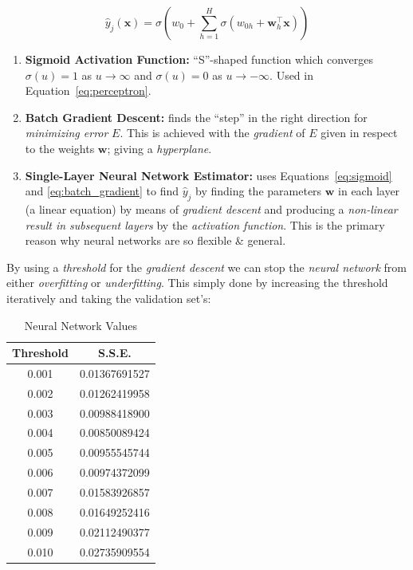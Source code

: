\documentclass[a4paper, twocolumn]{article}
\begin{document}
    \begin{equation} \label{eq:perceptron}
        \hat{y}_j(\bm{x}) = \sigma(w_0 + \sum_{h=1}^{H} \sigma(w_{0h} + \bm{w}_h^\intercal\bm{x}))
    \end{equation}

    \newpage
    \begin{enumerate}
        \item{\textbf{Sigmoid Activation Function:} ``S''-shaped function which converges $\sigma(u) = 1$ as $u \to \infty$ and $\sigma(u) = 0$ as $u \to -\infty$. Used in Equation~\ref{eq:perceptron}.}
        \item{\textbf{Batch Gradient Descent:} finds the ``step'' in the right direction for \emph{minimizing error} $E$. This is achieved with the \emph{gradient} of $E$ given in respect to the weights $\bm{w}$; giving a \emph{hyperplane}.}
        \item{\textbf{Single-Layer Neural Network Estimator:} uses Equations~\ref{eq:sigmoid} and \ref{eq:batch_gradient} to find $\hat{y}_j$ by finding the parameters $\bm{w}$ in each layer (a linear equation) by means of \emph{gradient descent} and producing a \emph{non-linear result in subsequent layers} by the \emph{activation function}. This is the primary reason why neural networks are so flexible \& general.}
    \end{enumerate}

    By using a \emph{threshold} for the \emph{gradient descent} we can stop the \emph{neural network} from either \emph{overfitting} or \emph{underfitting}. This simply done by increasing the threshold iteratively and taking the validation set's:

    \begin{table}[h!]
        \begin{center}
            \begin{tabular}{cc}
                \toprule
                \textbf{Threshold} & \textbf{S.S.E.} \\
                \midrule
                0.001 & 0.01367691527 \\
                0.002 & 0.01262419958 \\
                0.003 & 0.00988418900 \\
                0.004 & 0.00850089424 \\
                0.005 & 0.00955545744 \\
                0.006 & 0.00974372099 \\
                0.007 & 0.01583926857 \\
                0.008 & 0.01649252416 \\
                0.009 & 0.02112490377 \\
                0.010 & 0.02735909554 \\
                \bottomrule
            \end{tabular}
        \end{center}
        \caption{Neural Network Values}
        \label{tab:forecast}
    \end{table}
\end{document}
